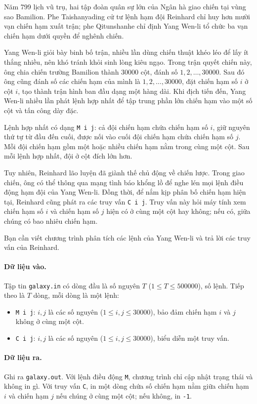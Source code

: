 \documentclass[11pt]{article}
\begin{document}
Năm 799 lịch vũ trụ, hai tập đoàn quân sự lớn của Ngân hà giao chiến tại
vùng sao Bamilion. Phe Taishanyading cử tư lệnh hạm đội Reinhard chỉ huy hơn
mười vạn chiến hạm xuất trận; phe Qitunshanhe chỉ định Yang Wen-li tổ chức
ba vạn chiến hạm dưới quyền để nghênh chiến.

Yang Wen-li giỏi bày binh bố trận, nhiều lần dùng chiến thuật khéo léo để lấy
ít thắng nhiều, nên khó tránh khỏi sinh lòng kiêu ngạo. Trong trận quyết
chiến này, ông chia chiến trường Bamilion thành $30000$ cột, đánh số
$1,2,\ldots,30000$. Sau đó ông cũng đánh số các chiến hạm của mình là
$1,2,\ldots,30000$, đặt chiến hạm số $i$ ở cột $i$, tạo thành trận hình ban
đầu dạng một hàng dài. Khi địch tiến đến, Yang Wen-li nhiều lần phát lệnh hợp
nhất để tập trung phần lớn chiến hạm vào một số cột và tấn công dày đặc.

Lệnh hợp nhất có dạng \texttt{M i j}: cả đội chiến hạm chứa chiến hạm số
$i$, giữ nguyên thứ tự từ đầu đến cuối, được nối vào cuối đội chiến hạm chứa
chiến hạm số $j$. Mỗi đội chiến hạm gồm một hoặc nhiều chiến hạm nằm trong
cùng một cột. Sau mỗi lệnh hợp nhất, đội ở cột đích lớn hơn.

Tuy nhiên, Reinhard lão luyện đã giành thế chủ động về chiến lược. Trong giao
chiến, ông có thể thông qua mạng tình báo khổng lồ để nghe lén mọi lệnh điều
động hạm đội của Yang Wen-li. Đồng thời, để nắm kịp phân bố chiến hạm hiện
tại, Reinhard cũng phát ra các truy vấn \texttt{C i j}. Truy vấn này hỏi máy
tính xem chiến hạm số $i$ và chiến hạm số $j$ hiện có ở cùng một cột hay
không; nếu có, giữa chúng có bao nhiêu chiến hạm.

Bạn cần viết chương trình phân tích các lệnh của Yang Wen-li và trả lời các
truy vấn của Reinhard.

\paragraph{Dữ liệu vào.}
Tập tin \texttt{galaxy.in} có dòng đầu là số nguyên $T$
($1\le T\le 500000$), số lệnh. Tiếp theo là $T$ dòng, mỗi dòng là một lệnh:
\begin{itemize}
  \item \texttt{M i j}: $i,j$ là các số nguyên
  ($1\le i,j\le 30000$), bảo đảm chiến hạm $i$ và $j$ không ở cùng một cột.
  \item \texttt{C i j}: $i,j$ là các số nguyên
  ($1\le i,j\le 30000$), biểu diễn một truy vấn.
\end{itemize}

\paragraph{Dữ liệu ra.}
Ghi ra \texttt{galaxy.out}. Với lệnh điều động \texttt{M}, chương trình chỉ
cập nhật trạng thái và không in gì. Với truy vấn \texttt{C}, in một dòng chứa
số chiến hạm nằm giữa chiến hạm $i$ và chiến hạm $j$ nếu chúng ở cùng một
cột; nếu không, in \texttt{-1}.
\end{document}
